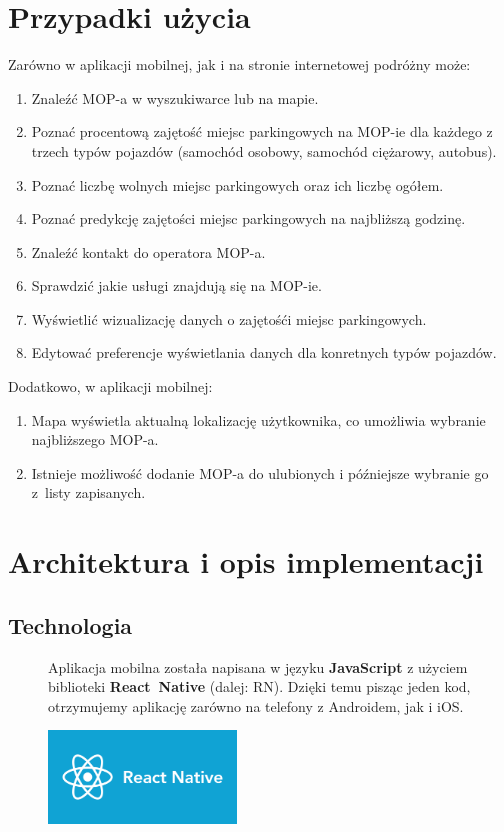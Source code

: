\section{Przypadki użycia}
Zarówno w aplikacji mobilnej, jak i na stronie internetowej podróżny może:
\begin{enumerate}
\item Znaleźć MOP-a w wyszukiwarce lub na mapie.
\item Poznać procentową zajętość miejsc parkingowych na MOP-ie dla każdego z trzech typów pojazdów (samochód osobowy, samochód ciężarowy, autobus).
\item Poznać liczbę wolnych miejsc parkingowych oraz ich liczbę ogółem.
\item Poznać predykcję zajętości miejsc parkingowych na najbliższą godzinę.
\item Znaleźć kontakt do operatora MOP-a.
\item Sprawdzić jakie usługi znajdują się na MOP-ie.
\item Wyświetlić wizualizację danych o zajętośći miejsc parkingowych.
\item Edytować preferencje wyświetlania danych dla konretnych typów pojazdów.
\end{enumerate}
Dodatkowo, w aplikacji mobilnej:
\begin{enumerate}
\item Mapa wyświetla aktualną lokalizację użytkownika, co umożliwia wybranie najbliższego MOP-a. 
\item Istnieje możliwość dodanie MOP-a do ulubionych i późniejsze wybranie go z~listy zapisanych.
\end{enumerate}


\section{Architektura i opis implementacji}

\subsection{Technologia}
\begin{figure}[!htb]
    \centering
    \begin{minipage}{.6\textwidth}
Aplikacja mobilna została napisana w języku \textbf{JavaScript} z użyciem biblioteki \textbf{React~Native} (dalej: RN). Dzięki temu pisząc jeden kod, otrzymujemy aplikację zarówno na telefony z Androidem, jak i iOS.
    \end{minipage}%
    \begin{minipage}{.4\textwidth}
        \centering
        \includegraphics[width=5cm]{images/ReactNative.png}\label{RN_logo}
    \end{minipage}
\end{figure}

